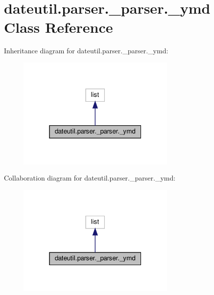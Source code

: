 \hypertarget{classdateutil_1_1parser_1_1__parser_1_1__ymd}{}\section{dateutil.\+parser.\+\_\+parser.\+\_\+ymd Class Reference}
\label{classdateutil_1_1parser_1_1__parser_1_1__ymd}


Inheritance diagram for dateutil.\+parser.\+\_\+parser.\+\_\+ymd\+:
\nopagebreak
\begin{figure}[H]
\begin{center}
\leavevmode
\includegraphics[width=220pt]{classdateutil_1_1parser_1_1__parser_1_1__ymd__inherit__graph}
\end{center}
\end{figure}


Collaboration diagram for dateutil.\+parser.\+\_\+parser.\+\_\+ymd\+:
\nopagebreak
\begin{figure}[H]
\begin{center}
\leavevmode
\includegraphics[width=220pt]{classdateutil_1_1parser_1_1__parser_1_1__ymd__coll__graph}
\end{center}
\end{figure}

